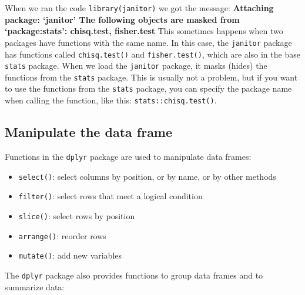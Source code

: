 \documentclass[
  letterpaper,
  8pt,
  a4paper]{book}
\providecommand{\tightlist}{%
  \setlength{\itemsep}{0pt}\setlength{\parskip}{0pt}}
\begin{document}
\begin{tcolorbox}[enhanced jigsaw, arc=.35mm, bottomrule=.15mm, bottomtitle=1mm, breakable, colback=white, colbacktitle=quarto-callout-note-color!10!white, colframe=quarto-callout-note-color-frame, coltitle=black, left=2mm, leftrule=.75mm, opacityback=0, opacitybacktitle=0.6, rightrule=.15mm, title=\textcolor{quarto-callout-note-color}{\faInfo}\hspace{0.5em}{Note}, titlerule=0mm, toprule=.15mm, toptitle=1mm]

When we ran the code \texttt{library(janitor)} we got the message:
\textbf{Attaching package: `janitor' The following objects are masked
from `package:stats': chisq.test, fisher.test} This sometimes happens
when two packages have functions with the same name. In this case, the
\texttt{janitor} package has functions called \texttt{chisq.test()} and
\texttt{fisher.test()}, which are also in the base \texttt{stats}
package. When we load the \texttt{janitor} package, it masks (hides) the
functions from the \texttt{stats} package. This is usually not a
problem, but if you want to use the functions from the \texttt{stats}
package, you can specify the package name when calling the function,
like this: \texttt{stats::chisq.test()}.

\end{tcolorbox}

\subsection*{Manipulate the data frame}\label{manipulate-the-data-frame}

Functions in the \texttt{dplyr} package are used to manipulate data
frames:

\begin{itemize}
\tightlist
\item
  \texttt{select()}: select columns by position, or by name, or by other
  methods
\item
  \texttt{filter()}: select rows that meet a logical condition
\item
  \texttt{slice()}: select rows by position
\item
  \texttt{arrange()}: reorder rows
\item
  \texttt{mutate()}: add new variables
\end{itemize}

The \texttt{dplyr} package also provides functions to group data frames
and to summarize data:
\end{document}

